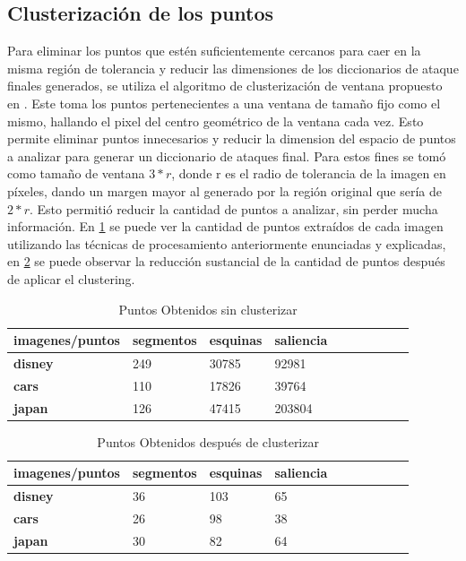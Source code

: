 \subsection{Clusterizaci\'on de los puntos }
Para eliminar los puntos que est\'en suficientemente cercanos para caer en la misma regi\'on de tolerancia y reducir las dimensiones de los diccionarios de ataque finales generados, se utiliza el algoritmo de clusterizaci\'on de ventana propuesto en \cite{van2010purely}. Este toma los puntos pertenecientes a una ventana de tama\~no fijo como el mismo, hallando el pixel del centro geom\'etrico de la ventana cada vez. Esto permite eliminar puntos innecesarios y reducir la dimension del espacio de puntos a analizar para generar un diccionario de ataques final. Para estos fines se tom\'o como tama\~no de ventana $3*r$, donde r es el radio de tolerancia de la imagen en p\'ixeles, dando un margen mayor al generado por la regi\'on original que ser\'ia de $2*r$. Esto permiti\'o reducir la cantidad de puntos a analizar, sin perder mucha informaci\'on. En \ref{points:void} se puede ver la cantidad de puntos extra\'idos de cada imagen utilizando las t\'ecnicas de procesamiento anteriormente enunciadas y explicadas, en \ref{points:cluster} se puede observar la reducci\'on sustancial de la cantidad de puntos despu\'es de aplicar el clustering.
\begin{table}[H]
	\centering
	\caption{Puntos Obtenidos sin clusterizar}
	\label{points:void}
	\begin{tabular}{|l|l|l|l|l|l|l|l|l|l|}
		\hline
		\textbf{imagenes/puntos} & \textbf{segmentos } & \textbf{esquinas} & \textbf{saliencia}
		\\ \hline
		\textbf{disney} & 249 & 30785 & 92981 \\ \hline
		\textbf{cars} & 110 & 17826 & 39764 \\ \hline
		\textbf{japan} & 126 & 47415 & 203804  \\ \hline
	
	\end{tabular}
\end{table}

\begin{table}[H]
	\centering
	\caption{Puntos Obtenidos despu\'es de clusterizar}
		\label{points:cluster}
	\begin{tabular}{|l|l|l|l|l|l|l|l|l|l|}
		\hline
		\textbf{imagenes/puntos} & \textbf{segmentos} & \textbf{esquinas} & \textbf{saliencia }  \\ \hline
		\textbf{disney} & 36 & 103 & 65  \\ \hline
		\textbf{cars} & 26 & 98 & 38  \\ \hline
		\textbf{japan} & 30 & 82 & 64 \\ \hline
	\end{tabular}
\end{table}

